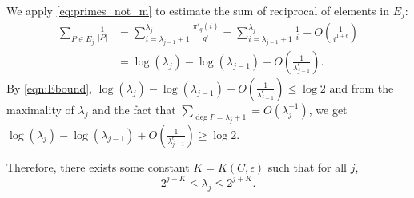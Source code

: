 \documentclass[12pt]{amsart}
\numberwithin{equation}{section}
\theoremstyle{definition}
\theoremstyle{remark}
\newcommand{\ps}[1]{\left( #1 \right)}
\begin{document}
We apply \eqref{eq:primes_not_m} to estimate the sum of reciprocal of elements in $E_j$:
\begin{align*}
    \sum_{P\in E_j} \frac{1}{|P|} &= \sum_{i=\lambda_{j-1}+1}^{\lambda_j} \frac{\pi'_q(i)}{q^i} 
    = \sum_{i=\lambda_{j-1}+1}^{\lambda_j} \frac{1}{i} + O\ps{\frac{1}{i^{1+\epsilon}}} \\
     &=\log(\lambda_j) - \log(\lambda_{j-1}) + O\ps{\frac{1}{\lambda_{j-1}^{\epsilon}}}.  
\end{align*}
By \eqref{eqn:Ebound}, $\log(\lambda_j) - \log(\lambda_{j-1}) + O\ps{\frac{1}{\lambda_{j-1}^{\epsilon}}}\leq \log 2$ and from the maximality of $\lambda_j$ and the fact that $\sum_{\deg P=\lambda_{j}+1} = O(\lambda_{j}^{-1})$, we get $\log(\lambda_j) - \log(\lambda_{j-1}) + O\ps{\frac{1}{\lambda_{j-1}^{\epsilon}}}\geq \log 2$. 

Therefore,  
there exists some constant $K = K(C,\epsilon)$ such that for all $j$,
\begin{equation}\label{eqn:lambda_bound}
    2^{j-K} \leq \lambda_j \leq 2^{j+K}.
\end{equation}
\end{document}
